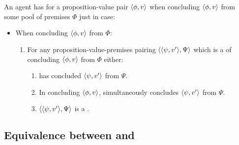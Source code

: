 \chapter{\zetaS{}}

\section{\zetaS{}}
\label{cha:zS:sec:zetaS}

\subsection{\zetaS{}}
\label{sec:zs2}

\begin{note}
  \begin{idea}[\izetaS{}]
    \label{idea:zetaS}
    An agent \vAgent{} has \emph{\zetaS{}} for a proposition-value pair \(\langle \phi, v \rangle\) when concluding \(\langle \phi, v \rangle\) from some pool of premises \(\Phi\) just in case:
    \begin{itemize}
    \item When concluding \(\langle \phi, v \rangle\) from \(\Phi\):
      \begin{enumerate}[label=\arabic*., ref=\named{CS:\arabic*}]
      \item
        \label{idea:zetaS::requ}
        For any proposition-value-premises pairing \(\langle \langle \psi, v' \rangle, \Psi \rangle\) which is a \requ{} of concluding \(\langle \phi, v \rangle\) from \(\Phi\) either:
        \begin{enumerate}[label=\alph*., ref=\named{CS:1.\alph*}]
        \item
          \label{idea:zetaS::requ-sat:Past}
          \vAgent{} has concluded \(\langle \psi, v' \rangle\) from \(\Psi\).
        \item
          \label{idea:zetaS::requ-sat:Pres}
          In concluding \(\langle \phi, v \rangle\), \vAgent{} simultaneously concludes \(\langle \psi, v' \rangle\) from \(\Psi\).
        \item
          \label{idea:zetaS::requ-sat:Forgone}
          \(\langle \langle \psi, v' \rangle, \Psi \rangle\) is a .
        \end{enumerate}
      \end{enumerate}
    \end{itemize}
    \vspace{-\baselineskip}
  \end{idea}
\end{note}

\section{Equivalence between \qzS{} and \izetaS{}}
\label{sec:overview:an-equiv-stat-of-zs}

